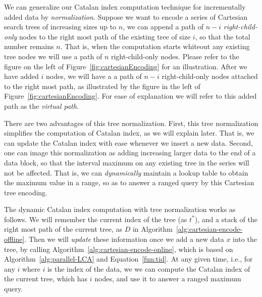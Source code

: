 We can generalize our Catalan index computation technique for
incrementally added data by {\em normalization}.  Suppose we want to
encode a series of Cartesian search trees of increasing sizes up to
$n$, we can append a path of $n-i$ {\em right-child-only} nodes to the
right most path of the existing tree of size $i$, so that the total
number remains $n$.  That is, when the computation starts whiteout any
existing tree nodes we will use a path of $n$ right-child-only nodes.
Please refer to the figure on the left of
Figure~\ref{fig:cartesianEncoding} for an illustration.  After we have
added $i$ nodes, we will have a a path of $n - i$ right-child-only
nodes attached to the right most path, as illustrated by the figure in
the left of Figure~\ref{fig:cartesianEncoding}.  For ease of
explanation we will refer to this added path as the {\em virtual
  path}.

\begin{figure*}[!thb]
  \centering {}  
  \caption{An example for difference algorithm to encode Cartesian tree.}
  \label{fig:cartesianEncoding}
\end{figure*}

There are two advantages of this tree normalization.  First, this tree
normalization simplifies the computation of Catalan index, as we will
explain later.  That is, we can update the Catalan index with ease
whenever we insert a new data.  Second, one can image this
normalization as adding increasing larger data to the end of a data
block, so that the interval maximum on any existing tree in the series
will not be affected.  That is, we can {\em dynamically} maintain a
lookup table to obtain the maximum value in a range, so as to answer a
ranged query by this Cartesian tree encoding.


The dynamic Catalan index computation with tree normalization works as
follows.  We will remember the current index of the tree (as $t^*$),
and a stack of the right most path of the current tree, as $D$ in
Algorithm~\ref{alg:cartesian-encode-offline}.  Then we will {\em
  update} these information once we add a new data $x$ into the tree,
by calling Algorithm~\ref{alg:cartesian-encode-online}, which is based
on Algorithm~\ref{alg:parallel-LCA} and Equation~\ref{fun:tid}.  At
any given time, i.e., for any $i$ where $i$ is the index of the data,
we we can compute the Catalan index of the current tree, which has $i$
nodes, and use it to answer a ranged maximum query.

